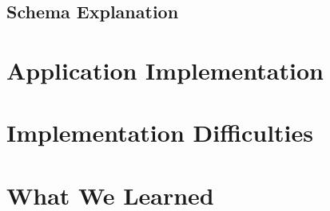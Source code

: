 \documentclass[12pt]{article}
\begin{document}
\subsection{Schema Explanation}

%

\section{Application Implementation}


\section{Implementation Difficulties}


\section{What We Learned}

\end{document}
